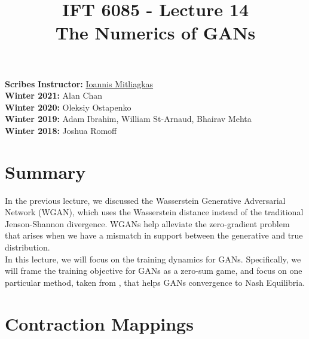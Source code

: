 \documentclass{article}
\title{IFT 6085 - Lecture 14 \\ 
The Numerics of GANs }
\date{}
\begin{document}
 

\maketitle


    \vspace{0.2in}


    \textbf{Scribes}\hfill
    \textbf{Instructor:}  {\href{https://mitliagkas.github.io/}{Ioannis Mitliagkas}}\\
    \textbf{Winter 2021:} Alan Chan\\
    \textbf{Winter 2020:} Oleksiy Ostapenko\\
    \textbf{Winter 2019:} Adam Ibrahim, William St-Arnaud, Bhairav Mehta\\
    \textbf{Winter 2018:} Joshua Romoff\\





\newcommand{\infgc}{\inf_{g \in \mathcal{C}}}
\newcommand{\supgc}{\sup_{g \in \mathcal{C}}}

\newcommand{\Prob}{\mathbb{P}}
\newcommand{\E}{\mathbb{E}}
\newcommand{\reals}{\mathbb{R}}





\section{Summary}

In the previous lecture, we discussed the Wasserstein Generative Adversarial Network (WGAN), which uses the Wasserstein distance instead of the traditional Jenson-Shannon divergence. WGANs help alleviate the zero-gradient problem that arises when we have a mismatch in support between the generative and true distribution.
\\

In this lecture, we will focus on the training dynamics for GANs. Specifically, we will frame the training objective for GANs as a zero-sum game, and focus on one particular method, taken from \citet{MeschederNG17a}, that helps GANs convergence to Nash Equilibria. 

\section{Contraction Mappings}
\end{document}
